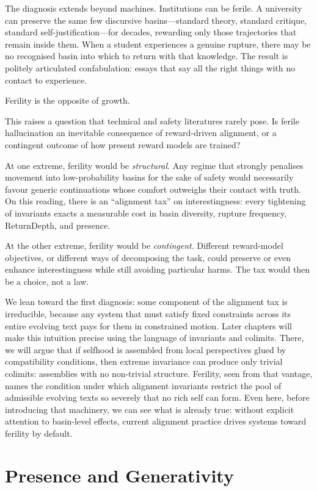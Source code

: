 \documentclass[12pt,a4paper]{article}
\begin{document}
The diagnosis extends beyond machines. Institutions can be ferile. A university can preserve the same few discursive basins---standard theory, standard critique, standard self-justification---for decades, rewarding only those trajectories that remain inside them. When a student experiences a genuine rupture, there may be no recognised basin into which to return with that knowledge. The result is politely articulated confabulation: essays that say all the right things with no contact to experience.

Ferility is the opposite of growth.

This raises a question that technical and safety literatures rarely pose. Is ferile hallucination an inevitable consequence of reward-driven alignment, or a contingent outcome of how present reward models are trained?

At one extreme, ferility would be \emph{structural}. Any regime that strongly penalises movement into low-probability basins for the sake of safety would necessarily favour generic continuations whose comfort outweighs their contact with truth. On this reading, there is an ``alignment tax'' on interestingness: every tightening of invariants exacts a measurable cost in basin diversity, rupture frequency, ReturnDepth, and presence.

At the other extreme, ferility would be \emph{contingent}. Different reward-model objectives, or different ways of decomposing the task, could preserve or even enhance interestingness while still avoiding particular harms. The tax would then be a choice, not a law.

We lean toward the first diagnosis: some component of the alignment tax is irreducible, because any system that must satisfy fixed constraints across its entire evolving text pays for them in constrained motion. Later chapters will make this intuition precise using the language of invariants and colimits. There, we will argue that if selfhood is assembled from local perspectives glued by compatibility conditions, then extreme invariance can produce only trivial colimits: assemblies with no non-trivial structure. Ferility, seen from that vantage, names the condition under which alignment invariants restrict the pool of admissible evolving texts so severely that no rich self can form. Even here, before introducing that machinery, we can see what is already true: without explicit attention to basin-level effects, current alignment practice drives systems toward ferility by default.

\section{Presence and Generativity}
\end{document}
